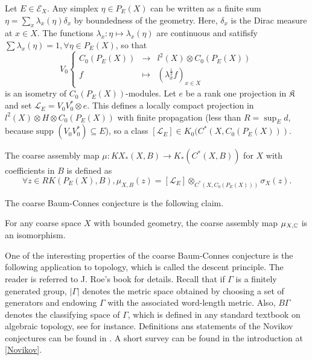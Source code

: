 Let $E\in \mathcal E_X$. Any simplex $\eta\in P_E(X)$ can be written as a finite sum $\eta=\sum_x \lambda_x(\eta)\delta_x$ by boundedness of the geometry. Here, $\delta_x$ is the Dirac measure at $x\in X$. The functions $\lambda_x :\eta\mapsto \lambda_x(\eta)$ are continuous and satifisfy $\sum\lambda_x(\eta) = 1,\forall\eta\in P_E(X)$, so that
\[\label{V0}\tag{1} V_0\left\{\begin{array}{rcl} 
 C_0(P_E(X)) & \rightarrow 	& l^2(X)\otimes C_0(P_E(X)) 		\\ 
 f           & \mapsto 		& (\lambda_x^{\frac{1}{2}}f)_{x\in X} 
\end{array}\right.\] 
is an isometry of $C_0(P_E(X))$-modules. Let $e$ be a rank one projection in $\mathfrak K$ and set $\mathcal L_E = V_0V_0^*\otimes e$. This defines a locally compact projection in $l^2(X)\otimes H\otimes C_0(P_E(X))$ with finite propagation (less than $R= \sup_E d$, because $\text{supp }(V_0 V_0^*)\subseteq E$), so a class $[\mathcal L_E]\in K_0(C^*(X,C_0(P_E(X)))$.

\begin{definition}
The coarse assembly map $\mu:KX_*(X,B)\rightarrow K_*(C^*(X,B))$ for $X$ with coefficients in $B$ is defined as 
\[\forall z\in RK(P_E(X), B), \mu_{X,B}(z)=[\mathcal L_E]\otimes_{C^*(X,C_0(P_E(X)))} \sigma_X(z).\]
\end{definition}

The coarse Baum-Connes conjecture is the following claim.

\begin{conj}
For any coarse space $X$ with bounded geometry, the coarse assembly map $\mu_{X,\mathbb C}$ is an isomorphism.\\
\end{conj}


One of the interesting properties of the coarse Baum-Connes conjecture is the following application to topology, which is called the descent principle. The reader is referred to J. Roe's book \cite{RoeIndex} for details. Recall that if $\Gamma$ is a finitely generated group, $|\Gamma|$ denotes the metric space obtained by choosing a set of generators and endowing $\Gamma$ with the  associated word-length metric. Also, $B\Gamma$ denotes the classifying space of $\Gamma$, which is defined in any standard textbook on algebraic topology, see \cite{May} for instance. Definitions ans statements of the Novikov conjectures can be found in \cite{ferrynovikov}. A short survey can be found in the introduction at \ref{Novikov}.

